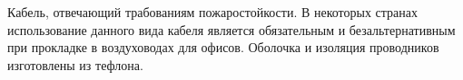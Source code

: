 Кабель, отвечающий трабованиям пожаростойкости. В некоторых 
странах использование данного вида кабеля является обязательным 
и безальтернативным при прокладке в воздуховодах для 
офисов. Оболочка и изоляция проводников изготовлены из тефлона.